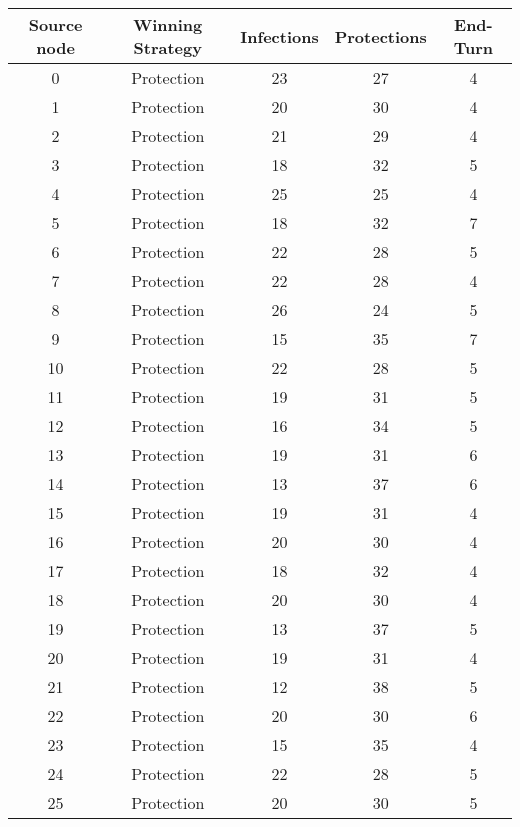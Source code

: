 \documentclass[results.tex]{subfiles}
\begin{document}
\begin{center}
  \begin{tabular}{| c || c | c | c | c |}
    \hline
    {\bfseries Source node} & {\bfseries Winning Strategy} & {\bfseries Infections} & {\bfseries Protections} & {\bfseries End-Turn} \\  %
    \hline\hline
    0 & Protection & 23 & 27 & 4 \\ 
    \hline
    1 & Protection & 20 & 30 & 4 \\ 
    \hline
    2 & Protection & 21 & 29 & 4 \\ 
    \hline
    3 & Protection & 18 & 32 & 5 \\ 
    \hline
    4 & Protection & 25 & 25 & 4 \\ 
    \hline
    5 & Protection & 18 & 32 & 7 \\ 
    \hline
    6 & Protection & 22 & 28 & 5 \\ 
    \hline
    7 & Protection & 22 & 28 & 4 \\ 
    \hline
    8 & Protection & 26 & 24 & 5 \\ 
    \hline
    9 & Protection & 15 & 35 & 7 \\ 
    \hline
    10 & Protection & 22 & 28 & 5 \\ 
    \hline
    11 & Protection & 19 & 31 & 5 \\ 
    \hline
    12 & Protection & 16 & 34 & 5 \\ 
    \hline
    13 & Protection & 19 & 31 & 6 \\ 
    \hline
    14 & Protection & 13 & 37 & 6 \\ 
    \hline
    15 & Protection & 19 & 31 & 4 \\ 
    \hline
    16 & Protection & 20 & 30 & 4 \\ 
    \hline
    17 & Protection & 18 & 32 & 4 \\ 
    \hline
    18 & Protection & 20 & 30 & 4 \\ 
    \hline
    19 & Protection & 13 & 37 & 5 \\ 
    \hline
    20 & Protection & 19 & 31 & 4 \\ 
    \hline
    21 & Protection & 12 & 38 & 5 \\ 
    \hline
    22 & Protection & 20 & 30 & 6 \\ 
    \hline
    23 & Protection & 15 & 35 & 4 \\ 
    \hline
    24 & Protection & 22 & 28 & 5 \\ 
    \hline
    25 & Protection & 20 & 30 & 5 \\ 

\end{tabular}
\end{center}
\end{document}
